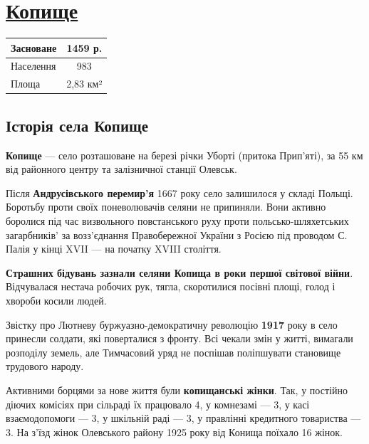 \section {\href{https://goo.gl/maps/gbZsZf485hsZxiuK9/}%
	{Копище}}

\begin{center}
	\begin{tabular}{| l | c |}
		\hline
		Засноване  & 1459 р.\\ 
		\hline
		Населення & 983 \\ 
		\hline 
		Площа & 2,83 км² \\   
		\hline
	\end{tabular}
\end{center}

\subsection{Історія села Копище}

\textbf{Копище} — село розташоване на березі річки Уборті (притока Прип’яті), за 55 км від районного центру та залізничної станції Олевськ.

Після \textbf{Андрусівського перемир’я} 1667 року село залишилося у складі Польщі. Боротьбу проти своїх поневолювачів селяни не припиняли. Вони активно боролися під час визвольного повстанського руху проти польсько-шляхетських загарбників’ за возз’єднання Правобережної України з Росією під проводом С. Палія у кінці XVII — на початку XVIII століття.

\textbf{Страшних бідувань зазнали селяни Копища в роки першої світової війни}. Відчувалася нестача робочих рук, тягла, скоротилися посівні площі, голод і хвороби косили людей.

Звістку про Лютневу буржуазно-демократичну революцію \textbf{1917} року в село принесли солдати, які поверталися з фронту. Всі чекали змін у житті, вимагали розподілу земель, але Тимчасовий уряд не поспішав поліпшувати становище трудового народу.

Активними борцями за нове життя були \textbf{копищанські жінки}. Так, у постійно діючих комісіях при сільраді їх працювало 4, у комнезамі — 3, у касі взаємодопомоги — 3, у шкільній раді — 3, у правлінні кредитного товариства — 3. На з’їзд жінок Олевського району 1925 року від Конища поїхало 16 жінок.

